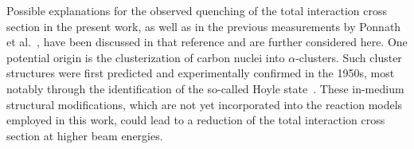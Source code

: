 Possible explanations for the observed quenching of the total interaction cross section in the present work, as well as in the previous measurements by Ponnath et al.~\cite{ponnath2024measurement}, have been discussed in that reference and are further considered here. One potential origin is the clusterization of carbon nuclei into $\alpha$-clusters. Such cluster structures were first predicted and experimentally confirmed in the 1950s, most notably through the identification of the so-called Hoyle state~\cite{hoyle1954nuclear,FREER20141}. These in-medium structural modifications, which are not yet incorporated into the reaction models employed in this work, could lead to a reduction of the total interaction cross section at higher beam energies.\newline


